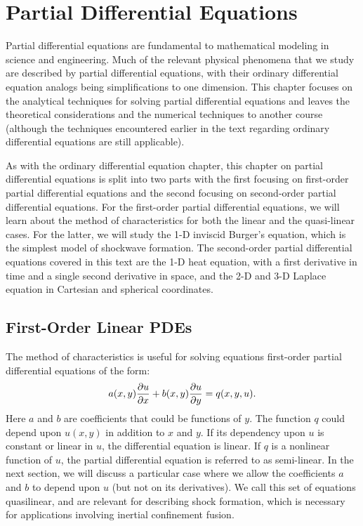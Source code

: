 \chapter{Partial Differential Equations} \label{Sec:pde}

Partial differential equations are fundamental to mathematical modeling in science and engineering. Much of the relevant physical phenomena that we study are described by partial differential equations, with their ordinary differential equation analogs being simplifications to one dimension. This chapter focuses on the analytical techniques for solving partial differential equations and leaves the theoretical considerations and the numerical techniques to another course (although the techniques encountered earlier in the text regarding ordinary differential equations are still applicable).

As with the ordinary differential equation chapter, this chapter on partial differential equations is split into two parts with the first focusing on first-order partial differential equations and the second focusing on second-order partial differential equations. For the first-order partial differential equations, we will learn about the method of characteristics for both the linear and the quasi-linear cases. For the latter, we will study the 1-D inviscid Burger's equation, which is the simplest model of shockwave formation. The second-order partial differential equations covered in this text are the 1-D heat equation, with a first derivative in time and a single second derivative in space, and the 2-D and 3-D Laplace equation in Cartesian and spherical coordinates.

\section{First-Order Linear PDEs}

The method of characteristics is useful for solving equations first-order partial differential equations of the form:
\begin{align}
  a(x,y) \frac{ \partial {u} }{ \partial {x} } + b(x,y) \frac{ \partial {u} }{ \partial {y} } = q(x,y,u) .
\end{align}
Here $a$ and $b$ are coefficients that could be functions of $y$. The function $q$ could depend upon $u(x,y)$ in addition to $x$ and $y$. If its dependency upon $u$ is constant or linear in $u$, the differential equation is linear. If $q$ is a nonlinear function of $u$, the partial differential equation is referred to as semi-linear. In the next section, we will discuss a particular case where we allow the coefficients $a$ and $b$ to depend upon $u$ (but not on its derivatives). We call this set of equations quasilinear, and are relevant for describing shock formation, which is necessary for applications involving inertial confinement fusion.

